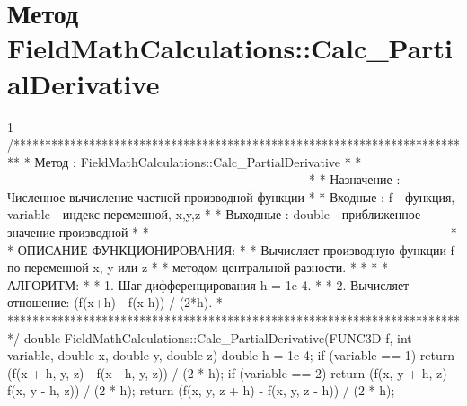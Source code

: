 \section{Метод FieldMathCalculations::Calc\_PartialDerivative}
\footnotesize
\begin{listing}{1}
/*************************************************************************
* Метод         : FieldMathCalculations::Calc_PartialDerivative          *
*------------------------------------------------------------------------*
* Назначение    : Численное вычисление частной производной функции       *
* Входные       : f - функция, variable - индекс переменной, x,y,z       *
* Выходные      : double - приближенное значение производной             *
*------------------------------------------------------------------------*
* ОПИСАНИЕ ФУНКЦИОНИРОВАНИЯ:                                             *
* Вычисляет производную функции f по переменной x, y или z               *
* методом центральной разности.                                          *
* *
* АЛГОРИТМ:                                                              *
* 1. Шаг дифференцирования h = 1e-4.                                     *
* 2. Вычисляет отношение: (f(x+h) - f(x-h)) / (2*h).                     *
*************************************************************************/
double FieldMathCalculations::Calc_PartialDerivative(FUNC3D f, int variable, 
                                                     double x, double y, 
                                                     double z) {
    double h = 1e-4;
    if (variable == 1) return (f(x + h, y, z) - f(x - h, y, z)) / (2 * h);
    if (variable == 2) return (f(x, y + h, z) - f(x, y - h, z)) / (2 * h);
    return (f(x, y, z + h) - f(x, y, z - h)) / (2 * h);
}
\end{listing}
\normalsize

\pagebreak


